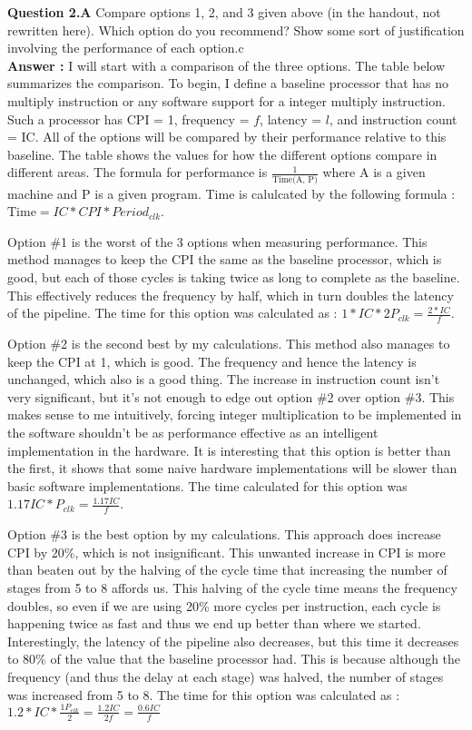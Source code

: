 \documentclass[a4paper,11pt]{article}
\newcommand{\answer}{\textbf{Answer : }}
\begin{document}
\item \textbf{Question 2.A} Compare options 1, 2, and 3 given above (in the handout, not rewritten here). Which option do you recommend? Show some sort of justification involving the performance of each option.c\\ 
\answer I will start with a comparison of the three options. The table below summarizes the comparison. To begin, I define a baseline processor that has no multiply instruction or any software support for a integer multiply instruction. Such a processor has CPI = 1, frequency = $f$, latency = $l$, and instruction count = IC. All of the options will be compared by their performance relative to this baseline. The table shows the values for how the different options compare in different areas.  The formula for performance is $\frac{1}{\text{Time(A, P)}}$ where A is a given machine and P is a given program. Time is calulcated by the following formula : $\text{Time} = IC * CPI * Period_{clk} $. \par

Option \#1 is the worst of the 3 options when measuring performance. This method manages to keep the CPI the same as the baseline processor, which is good, but each of those cycles is taking twice as long to complete as the baseline. This effectively reduces the frequency by half, which in turn doubles the latency of the pipeline. The time for this option was calculated as : $1*IC*2P_{clk} = \frac{2*IC}{f}$. \par

Option \#2 is the second best by my calculations. This method also manages to keep the CPI at 1, which is good. The frequency and hence the latency is unchanged, which also is a good thing. The increase in instruction count isn't very significant, but it's not enough to edge out option \#2 over option \#3. This makes sense to me intuitively, forcing integer multiplication to be implemented in the software shouldn't be as performance effective as an intelligent implementation in the hardware. It is interesting that this option is better than the first, it shows that some naive hardware implementations will be slower than basic software implementations. The time calculated for this option was $1.17IC*P_{clk} = \frac{1.17IC}{f}$. \par

Option \#3 is the best option by my calculations. This approach does increase CPI by 20\%, which is not insignificant. This unwanted increase in CPI is more than beaten out by the halving of the cycle time that increasing the number of stages from 5 to 8 affords us. This halving of the cycle time means the frequency doubles, so even if we are using 20\% more cycles per instruction, each cycle is happening twice as fast and thus we end up better than where we started. Interestingly, the latency of the pipeline also decreases, but this time it decreases to 80\% of the value that the baseline processor had. This is because although the frequency (and thus the delay at each stage) was halved, the number of stages was increased from 5 to 8. The time for this option was calculated as : $1.2*IC*\frac{1P_{clk}}{2} = \frac{1.2IC}{2f} = \frac{0.6IC}{f} $
\end{document}
